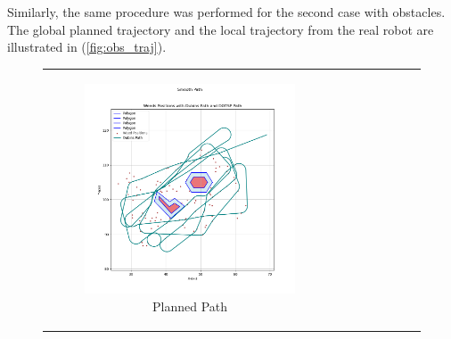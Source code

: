 

\vspace{3mm}   


Similarly, the same procedure was performed for the second case with obstacles. The global planned trajectory and the local trajectory from the real robot are illustrated in (\autoref{fig:obs_traj}). 

\begin{figure}[H]
    \centering
    \begin{tabular}{cc} 
        \begin{subfigure}{0.4\textwidth}
            \centering
            \includegraphics[width=\textwidth]{Images/real_robot/path_with_2_obs_v.png}
            \caption{Planned Path}
        \end{subfigure} 
        &
        \begin{subfigure}{0.4\textwidth}
            \centering

\end{subfigure}
\end{tabular}
\end{figure}
